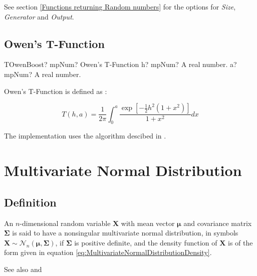 \vspace{0.3cm}

See section \ref{Functions returning Random numbers} for the options for  {\itshape\sffamily Size},  {\itshape\sffamily Generator} and {\itshape\sffamily Output}. 


\subsection{Owen's T-Function}
\label{sec:OwenTFunction}


\begin{mpFunctionsExtract}
	\mpFunctionTwo
	{TOwenBoost? mpNum? Owen's T-Function}
	{h? mpNum? A real number.}
	{a? mpNum? A real number.}
\end{mpFunctionsExtract}

\vspace{0.3cm}
Owen's T-Function is defined as \citep{owen_1956}:

\begin{equation}
	T(h,a) = \frac{1}{2\pi} \int_0^a \frac{\exp \left[-\tfrac{1}{2} h^2 (1+x^2)\right]}{1+x^2} dx
\end{equation}

The implementation uses the algorithm descibed in \cite{patefield_2000}.





\newpage
\section{Multivariate Normal Distribution}


\subsection{Definition}
\label{MultivariateNormalDistributionDefinition}
An $n$-dimensional random variable $\textbf{X}$ with mean vector $\boldsymbol{\mu}$ and covariance matrix  $\boldsymbol{\Sigma}$ is said to have a nonsingular multivariate normal distribution, in symbols $\boldsymbol{X}  \sim \mathcal{N}_n(\boldsymbol{\mu}, \boldsymbol{\Sigma})$, if  $\boldsymbol{\Sigma}$ is positive definite, and the density function of $\textbf{X}$ is of the form given in equation \ref{eq:MultivariateNormalDistributionDensity}.

See also \cite{Steck_1962}and \cite{owen_moments_1962}

